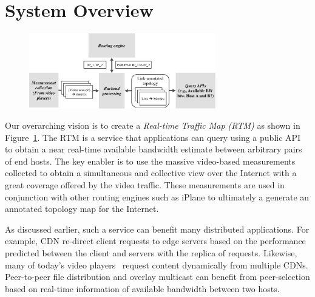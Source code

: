 \section{System Overview}
\label{sec:overview}


\begin{figure}[t!]
\centering
\includegraphics[width=230pt]{figures/system_overview_short.pdf}
\vspace{-0.3cm}
\label{fig:overview:system}
\end{figure}

Our overarching vision is to create a {\em  Real-time Traffic Map (RTM)}
 as shown in Figure~\ref{fig:overview:system}. The RTM is a
service that applications can query using a public API to obtain a near
real-time available bandwidth estimate between arbitrary pairs of end hosts.
 The key enabler  is to use the massive video-based measurements collected 
  to obtain a simultaneous and collective view over the Internet with
a great coverage offered by the video traffic.  These  measurements 
 are used in conjunction with other routing engines such as 
 iPlane to ultimately a generate an annotated topology map for the 
 Internet.

 
As discussed earlier, such a service can benefit many distributed applications.
For example, CDN re-direct client requests to edge servers based on the
performance predicted between the client and servers with the replica of
requests. Likewise, many of today's video players~\cite{hds,netflix} request
content dynamically from multiple CDNs.  Peer-to-peer file distribution and
overlay multicast can benefit from peer-selection based on real-time
information of available bandwidth between two hosts. 

